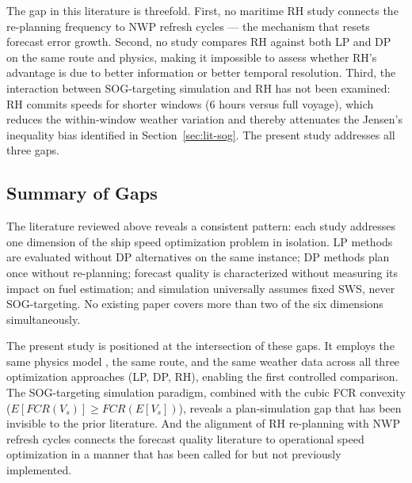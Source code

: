 \documentclass[review]{elsarticle}
\begin{document}
The gap in this literature is threefold. First, no maritime RH study connects the re-planning frequency to NWP refresh cycles --- the mechanism that resets forecast error growth. Second, no study compares RH against both LP and DP on the same route and physics, making it impossible to assess whether RH's advantage is due to better information or better temporal resolution. Third, the interaction between SOG-targeting simulation and RH has not been examined: RH commits speeds for shorter windows (6 hours versus full voyage), which reduces the within-window weather variation and thereby attenuates the Jensen's inequality bias identified in Section~\ref{sec:lit-sog}. The present study addresses all three gaps.

\subsection{Summary of Gaps}
\label{sec:lit-gaps}


The literature reviewed above reveals a consistent pattern: each study addresses one dimension of the ship speed optimization problem in isolation. LP methods are evaluated without DP alternatives on the same instance; DP methods plan once without re-planning; forecast quality is characterized without measuring its impact on fuel estimation; and simulation universally assumes fixed SWS, never SOG-targeting. No existing paper covers more than two of the six dimensions simultaneously.

The present study is positioned at the intersection of these gaps. It employs the same physics model \cite{Yang2020}, the same route, and the same weather data across all three optimization approaches (LP, DP, RH), enabling the first controlled comparison. The SOG-targeting simulation paradigm, combined with the cubic FCR convexity ($E[FCR(V_s)] \geq FCR(E[V_s])$), reveals a plan-simulation gap that has been invisible to the prior literature. And the alignment of RH re-planning with NWP refresh cycles connects the forecast quality literature to operational speed optimization in a manner that has been called for \cite{Yang2020,Luo2023} but not previously implemented.


\iffalse
\end{document}
